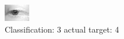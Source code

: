 \begin{figure}[h!]
\begin{center}
\includegraphics[width=0.60\columnwidth]{figures/ID2672_class_3_target_4.png}
\end{center}
\caption{ Classification: 3 actual target: 4}
\label{fig:ID2672_class_3_target_4}
\end{figure}
